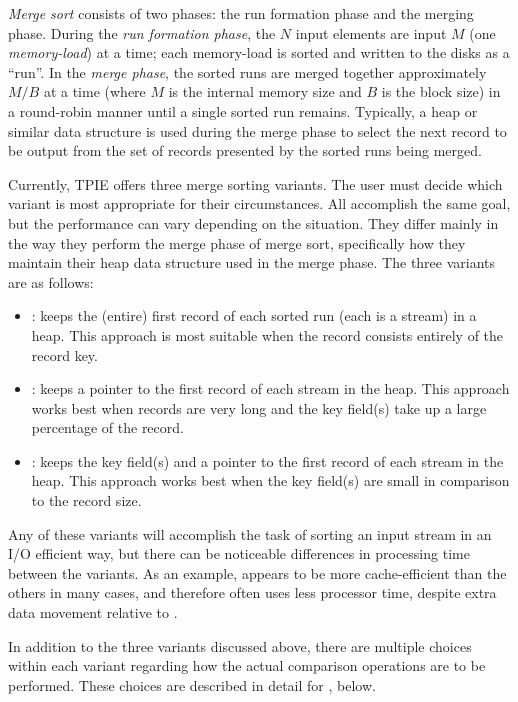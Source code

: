 \noindent
\emph{Merge sort} consists of two phases: the run formation
phase and the merging phase.  During the \emph{run formation
   phase}, the $N$ input elements are input $M$ (one \emph{memory-load})
at a time; each memory-load is sorted and written to the
disks as a ``run''.  In the \emph{merge phase}, the sorted
runs are merged together approximately $M/B$ at a time (where $M$
is the internal memory size and $B$ is the block size) in a
round-robin manner until a single sorted run remains.
Typically, a heap or similar data structure is used during
the merge phase to select the next record to be output from
the set of records presented by the sorted runs being
merged. 

Currently, TPIE offers three merge sorting variants. The
user must decide which variant is most appropriate for their
circumstances.  All accomplish the same goal, but the
performance can vary depending on the situation. They differ
mainly in the way they perform the merge phase of merge
sort, specifically how they maintain their heap data
structure used in the merge phase. The three variants are as
follows:
\begin{itemize}
    \item {}: keeps the (entire) first record
    of each sorted run (each is a stream) in a heap. This
    approach is most suitable when the record consists
    entirely of the record key.
    
    \item {}: keeps a pointer to the
    first record of each stream in the heap. This approach
    works best when records are very long and the key
    field(s) take up a large percentage of the record.

    \item {}: keeps the key field(s) and
    a pointer to the first record of each stream in the
    heap. This approach works best when the key field(s) are
    small in comparison to the record size.
\end{itemize}

Any of these variants will accomplish the task of sorting an
input stream in an I/O efficient way, but there can be
noticeable differences in processing time between the
variants. As an example,  appears to be
more cache-efficient than the others in many cases, and
therefore often uses less processor time, despite extra data
movement relative to .

In addition to the three variants discussed above, there are
multiple choices within each variant regarding how the
actual comparison operations are to be performed. These
choices are described in detail for , below.

